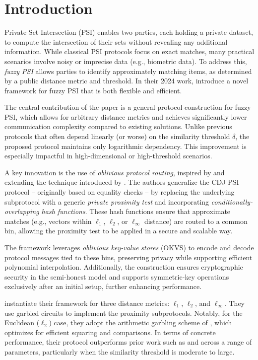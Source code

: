 \section{Introduction}

Private Set Intersection (PSI) enables two parties, each holding a private dataset, to compute the intersection of their sets without revealing any additional information. While classical PSI protocols focus on exact matches, many practical scenarios involve noisy or imprecise data (e.g., biometric data). To address this, \emph{fuzzy PSI} allows parties to identify approximately matching items, as determined by a public distance metric and threshold. In their 2024 work, \textcite{richardsonFuzzyPSIOblivious2024} introduce a novel framework for fuzzy PSI that is both flexible and efficient.

The central contribution of the paper is a general protocol construction for fuzzy PSI, which allows for arbitrary distance metrics and achieves significantly lower communication complexity compared to existing solutions. Unlike previous protocols that often depend linearly (or worse) on the similarity threshold $\delta$, the proposed protocol maintains only logarithmic dependency. This improvement is especially impactful in high-dimensional or high-threshold scenarios.

A key innovation is the use of \emph{oblivious protocol routing}, inspired by and extending the technique introduced by \textcite{choEfficientConcurrentCovert2016}. The authors generalize the CDJ PSI protocol -- originally based on equality checks -- by replacing the underlying subprotocol with a generic \emph{private proximity test} and incorporating \emph{conditionally-overlapping hash functions}. These hash functions ensure that approximate matches (e.g., vectors within $\ell_1$, $\ell_2$, or $\ell_\infty$ distance) are routed to a common bin, allowing the proximity test to be applied in a secure and scalable way.

The framework leverages \emph{oblivious key-value stores} (OKVS) to encode and decode protocol messages tied to these bins, preserving privacy while supporting efficient polynomial interpolation. Additionally, the construction ensures cryptographic security in the semi-honest model and supports symmetric-key operations exclusively after an initial setup, further enhancing performance.

\textcite{richardsonFuzzyPSIOblivious2024} instantiate their framework for three distance metrics: $\ell_1$, $\ell_2$, and $\ell_\infty$. They use garbled circuits to implement the proximity subprotocols. Notably, for the Euclidean ($\ell_2$) case, they adopt the arithmetic garbling scheme of \textcite{ballGarblingGadgetsBoolean2016}, which optimizes for efficient squaring and comparisons. In terms of concrete performance, their protocol outperforms prior work such as \textcite{vanbaarsenFuzzyPrivateSet2024} and \textcite{gaoEfficientFuzzyPrivate2025} across a range of parameters, particularly when the similarity threshold is moderate to large.

